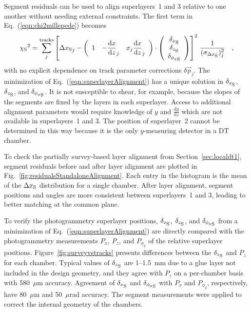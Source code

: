 \documentclass[11pt,twoside,a4paper,cmspaper]{cms-tdr}
\begin{document}
Segment residuals can be used to align superlayers~1 and 3 relative to
one another without needing external constraints.  The first term in
Eq.~(\ref{eqn:chi2millepede}) becomes
\begin{equation}
{\chi_{\mbox{\scriptsize S}}}^2 =
\sum_j^{\mbox{\scriptsize tracks}}
\left[\Delta {x_{\mbox{\scriptsize S}}}_j
- \bigg(\begin{array}{c c c}
1 & -\dfrac{\textrm{d}x}{\textrm{d}z}_j & x_j \dfrac{\textrm{d}x}{\textrm{d}z}_j \\
\end{array}\bigg) \cdot \left(\begin{array}{c}
\delta_{x_{\mbox{\scriptsize S}}} \\ \delta_{z_{\mbox{\scriptsize S}}} \\ \delta_{{\phi_y}_{\mbox{\scriptsize S}}} \\
\end{array} \right) \right]^2 \, \frac{1}{(\sigma_{{\Delta x_{\mbox{\scriptsize S}}}})_j^2} \quad\mbox{,}
\label{eqn:superlayerAlignment}
\end{equation}
with no explicit dependence on track parameter corrections
$\delta \vec{p}_j$.  The minimization of
Eq.~(\ref{eqn:superlayerAlignment}) has a unique solution in
$\delta_{x_{\mbox{\scriptsize S}}}$, $\delta_{z_{\mbox{\scriptsize
S}}}$, and $\delta_{{\phi_y}_{\mbox{\scriptsize S}}}$.  It is not
susceptible to shear, for example, because the slopes of the
segments are fixed by the layers in each superlayer.  Access to
additional alignment parameters would require knowledge of $y$ and
$\frac{\textrm{d}y}{\textrm{d}z}$ which are not available in superlayers~1 and 3.  The
position of superlayer~2 cannot be determined in this way because it
is the only $y$-measuring detector in a DT chamber.

To check the partially survey-based layer alignment from
Section~\ref{sec:localdt1}, segment residuals before and after
layer alignment are plotted in Fig.~\ref{fig:residualsStandaloneAlignment}.  Each
entry in the histogram is the mean of the $\Delta x_{\mbox{\scriptsize
S}}$ distribution for a single chamber.  After layer alignment,
segment positions and angles are more consistent between superlayers~1
and 3, leading to better matching at the common plane.

To verify the photogrammetry superlayer positions, 
$\delta_{x_{\mbox{\scriptsize S}}}$, $\delta_{z_{\mbox{\scriptsize
S}}}$, and $\delta_{{\phi_y}_{\mbox{\scriptsize S}}}$ from a
minimization of Eq.~(\ref{eqn:superlayerAlignment}) are directly compared with the
photogrammetry measurements $P_x$, $P_z$, and $P_{\phi_y}$ of the
relative superlayer positions.
Figure~\ref{fig:surveyvstracks} presents differences between the
$\delta_{z_{\mbox{\scriptsize S}}}$ and $P_z$ for each chamber.
Typical values of $\delta_{z_{\mbox{\scriptsize S}}}$ are 1--1.5~mm
due to a glue layer not included in the design geometry, and they
agree with $P_z$ on a per-chamber basis with 580~$\mu$m accuracy.
Agreement of $\delta_{x_{\mbox{\scriptsize S}}}$ and
$\delta_{{\phi_y}_{\mbox{\scriptsize S}}}$ with $P_x$ and
$P_{\phi_y}$, respectively, have 80~$\mu$m and 50~$\mu$rad accuracy.
The segment measurements were applied to correct the internal geometry
of the chambers.
\end{document}

